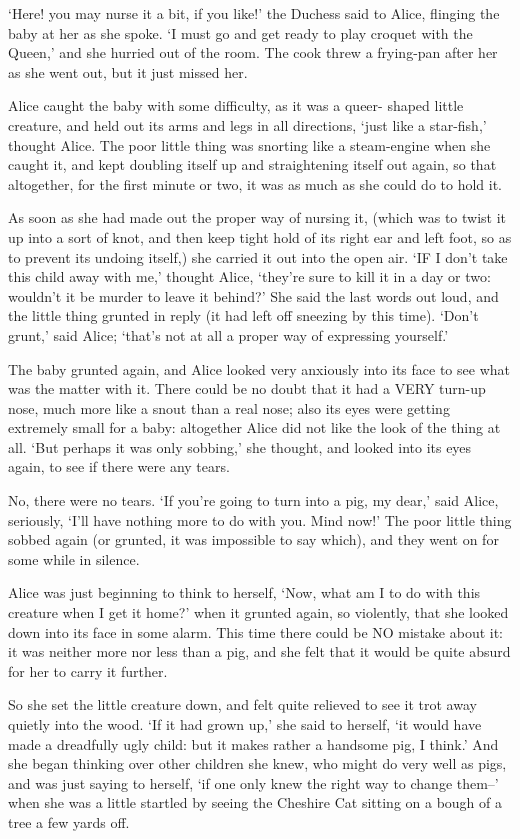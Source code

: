 \documentclass[12pt]{book}
\begin{document}
  `Here! you may nurse it a bit, if you like!' the Duchess said
to Alice, flinging the baby at her as she spoke.  `I must go and
get ready to play croquet with the Queen,' and she hurried out of
the room.  The cook threw a frying-pan after her as she went out,
but it just missed her.

  Alice caught the baby with some difficulty, as it was a queer-
shaped little creature, and held out its arms and legs in all
directions, `just like a star-fish,' thought Alice.  The poor
little thing was snorting like a steam-engine when she caught it,
and kept doubling itself up and straightening itself out again,
so that altogether, for the first minute or two, it was as much
as she could do to hold it.

  As soon as she had made out the proper way of nursing it,
(which was to twist it up into a sort of knot, and then keep
tight hold of its right ear and left foot, so as to prevent its
undoing itself,) she carried it out into the open air.  `IF I
don't take this child away with me,' thought Alice, `they're sure
to kill it in a day or two:  wouldn't it be murder to leave it
behind?'  She said the last words out loud, and the little thing
grunted in reply (it had left off sneezing by this time).  `Don't
grunt,' said Alice; `that's not at all a proper way of expressing
yourself.'

  The baby grunted again, and Alice looked very anxiously into
its face to see what was the matter with it.  There could be no
doubt that it had a VERY turn-up nose, much more like a snout
than a real nose; also its eyes were getting extremely small for
a baby:  altogether Alice did not like the look of the thing at
all.  `But perhaps it was only sobbing,' she thought, and looked
into its eyes again, to see if there were any tears.

  No, there were no tears.  `If you're going to turn into a pig,
my dear,' said Alice, seriously, `I'll have nothing more to do
with you.  Mind now!'  The poor little thing sobbed again (or
grunted, it was impossible to say which), and they went on for
some while in silence.

  Alice was just beginning to think to herself, `Now, what am I
to do with this creature when I get it home?' when it grunted
again, so violently, that she looked down into its face in some
alarm.  This time there could be NO mistake about it:  it was
neither more nor less than a pig, and she felt that it would be
quite absurd for her to carry it further.

  So she set the little creature down, and felt quite relieved to
see it trot away quietly into the wood.  `If it had grown up,'
she said to herself, `it would have made a dreadfully ugly child:
but it makes rather a handsome pig, I think.'  And she began
thinking over other children she knew, who might do very well as
pigs, and was just saying to herself, `if one only knew the right
way to change them--' when she was a little startled by seeing
the Cheshire Cat sitting on a bough of a tree a few yards off.
\end{document}
